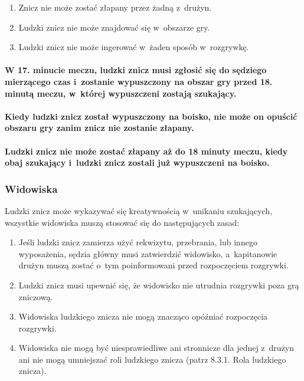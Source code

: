 \documentclass[12pt]{article}
\begin{document}
\begin{enumerate}
	\item Znicz nie może zostać złapany przez żadną z~drużyn.

	\item Ludzki znicz nie może znajdować się w~obszarze gry.

	\item Ludzki znicz nie może ingerować w~żaden sposób w~rozgrywkę.
\end{enumerate}

\paragraph{W 17. minucie meczu, ludzki znicz musi zgłosić się do
	sędziego mierzącego czas i~zostanie wypuszczony na obszar gry przed 18.
	minutą meczu, w~której wypuszczeni zostają szukający.}

\paragraph{Kiedy ludzki znicz został wypuszczony na boisko, nie
	może on opuścić obszaru gry zanim znicz nie zostanie złapany.}

\paragraph{Ludzki znicz nie może zostać złapany aż do 18 minuty
	meczu, kiedy obaj szukający i~ludzki znicz zostali już wypuszczeni na
	boisko.}

\subsubsection{Widowiska}

Ludzki znicz może wykazywać się kreatywnością w~unikaniu szukających,
wszystkie widowiska muszą stosować się do następujących zasad:

\begin{enumerate}
	\item
	      Jeśli ludzki znicz zamierza użyć rekwizytu, przebrania, lub innego
	      wyposażenia, sędzia główny musi zatwierdzić widowisko, a~kapitanowie
	      drużyn muszą zostać o~tym poinformowani przed rozpoczęciem rozgrywki.
	\item
	      Ludzki znicz musi upewnić się, że widowisko nie utrudnia rozgrywki
	      poza grą zniczową.
	\item
	      Widowiska ludzkiego znicza nie mogą znacząco opóźniać rozpoczęcia
	      rozgrywki.
	\item
	      Widowiska nie mogą być niesprawiedliwe ani stronnicze dla jednej z~drużyn ani nie mogą umniejszać roli ludzkiego znicza (patrz 8.3.1.
	      Rola ludzkiego znicza).
\end{enumerate}
\end{document}
